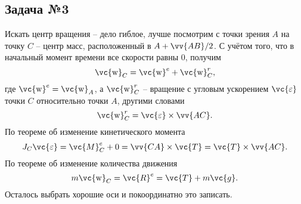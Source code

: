 \subsection*{Задача №3}

Искать центр вращения -- дело гиблое, лучше посмотрим с точки зрения $A$ на точку $C$ -- центр масс, расположенный в ${A} + \vv{AB}/2$. С учётом того, что в начальный момент времени все скорости равны 0, получим
\begin{equation}
    \vc{\mathrm{w}}_C = \vc{\mathrm{w}}^e + \vc{\mathrm{w}}^r_C,
\end{equation}
где $\vc{\mathrm{w}}^e = \vc{\mathrm{w}}_A$, а $\vc{\mathrm{w}}^r_C$ -- вращение с угловым ускорением $\vc{\varepsilon}$ точки $C$ относительно точки $A$, другими словами
\begin{equation}
    \vc{\mathrm{w}}^r_C = \vc{\varepsilon} \times \vv{AC}.
\end{equation}
По теореме об изменение кинетического момента
\begin{equation}
\label{cat}
    J_C \vc{\varepsilon} = \vc{M}_C^e + 0 = \vv{CA} \times \vc{T} = \vc{T} \times \vv{AC}.
\end{equation}
По теореме об изменение количества движения
\begin{equation}
\label{IIN}
    m \vc{\mathrm{w}}_C = \vc{R}^{e} = \vc{T} + m \vc{g}.
\end{equation}
Осталось выбрать хорошие оси и покоординатно это записать.

